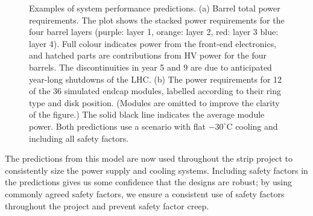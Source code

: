\begin{figure}[ht]
\centering
{}\quad\quad
{}
\caption{Examples of system performance predictions. (a) Barrel total power requirements. The plot shows the stacked power requirements for the four barrel layers (purple: layer 1, orange: layer 2, red: layer 3 blue: layer 4). Full colour indicates power from the front-end electronics, and hatched parts are contributions from HV power for the four barrels. The discontinuities in year 5 and 9 are due to anticipated year-long shutdowns of the LHC. (b) The power requirements for 12 of the 36 simulated endcap modules, labelled according to their ring type and disk position. (Modules are omitted to improve the clarity of the figure.) The solid black line indicates the average module power. Both predictions use a scenario with flat $-30^\circ$C cooling and including all safety factors.}
\label{fig:systemperformance}
\end{figure}

The predictions from this model are now used throughout the strip project to consistently size the power supply and cooling systems. Including safety factors in the predictions gives us some confidence that the designs are robust; by using commonly agreed safety factors, we ensure a consistent use of safety factors throughout the project and prevent safety factor creep.

